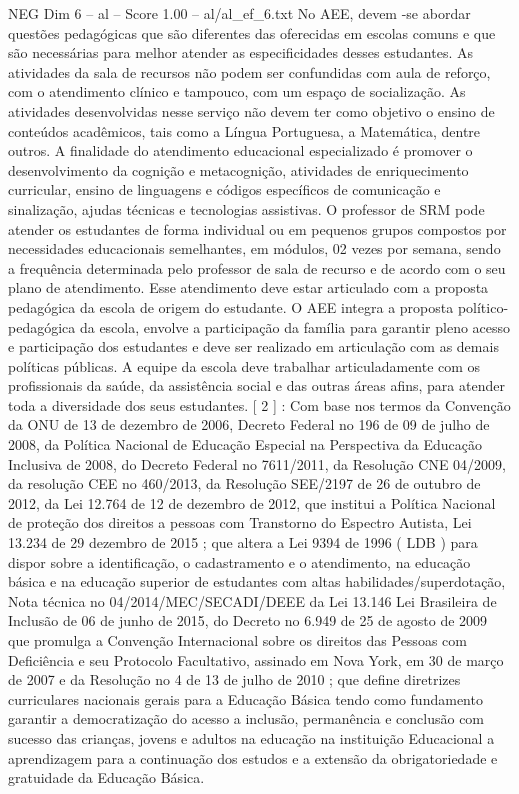 \begin{textsample}{NEG Dim 6 – al – Score 1.00 – al/al\_ef\_6.txt}
No AEE, devem -se abordar questões pedagógicas que são diferentes das oferecidas em escolas comuns e que são necessárias para melhor atender as especificidades desses estudantes.
As atividades da sala de recursos não podem ser confundidas com aula de reforço, com o atendimento clínico e tampouco, com um espaço de socialização.
As atividades desenvolvidas nesse serviço não devem ter como objetivo o ensino de conteúdos acadêmicos, tais como a Língua Portuguesa, a Matemática, dentre outros.
A finalidade do atendimento educacional especializado é promover o desenvolvimento da cognição e metacognição, atividades de enriquecimento curricular, ensino de linguagens e códigos específicos de comunicação e sinalização, ajudas técnicas e tecnologias assistivas.
O professor de SRM pode atender os estudantes de forma individual ou em pequenos grupos compostos por necessidades educacionais semelhantes, em módulos, 02 vezes por semana, sendo a frequência determinada pelo professor de sala de recurso e de acordo com o seu plano de atendimento.
Esse atendimento deve estar articulado com a proposta pedagógica da escola de origem do estudante.
O AEE integra a proposta político-pedagógica da escola, envolve a participação da família para garantir pleno acesso e participação dos estudantes e deve ser realizado em articulação com as demais políticas públicas.
A equipe da escola deve trabalhar articuladamente com os profissionais da saúde, da assistência social e das outras áreas afins, para atender toda a diversidade dos seus estudantes. [ 2 ] : Com base nos termos da Convenção da ONU de 13 de dezembro de 2006, Decreto Federal no 196 de 09 de julho de 2008, da Política Nacional de Educação Especial na Perspectiva da Educação Inclusiva de 2008, do Decreto Federal no 7611/2011, da Resolução CNE 04/2009, da resolução CEE no 460/2013, da Resolução SEE/2197 de 26 de outubro de 2012, da Lei 12.764 de 12 de dezembro de 2012, que institui a Política Nacional de proteção dos direitos a pessoas com Transtorno do Espectro Autista, Lei 13.234 de 29 dezembro de 2015 ; que altera a Lei 9394 de 1996 ( LDB ) para dispor sobre a identificação, o cadastramento e o atendimento, na educação básica e na educação superior de estudantes com altas habilidades/superdotação, Nota técnica no 04/2014/MEC/SECADI/DEEE da Lei 13.146 Lei Brasileira de Inclusão de 06 de junho de 2015, do Decreto no 6.949 de 25 de agosto de 2009 que promulga a Convenção Internacional sobre os direitos das Pessoas com Deficiência e seu Protocolo Facultativo, assinado em Nova York, em 30 de março de 2007 e da Resolução no 4 de 13 de julho de 2010 ; que define diretrizes curriculares nacionais gerais para a Educação Básica tendo como fundamento garantir a democratização do acesso a inclusão, permanência e conclusão com sucesso das crianças, jovens e adultos na educação na instituição Educacional a aprendizagem para a continuação dos estudos e a extensão da obrigatoriedade e gratuidade da Educação Básica.

\end{textsample}
